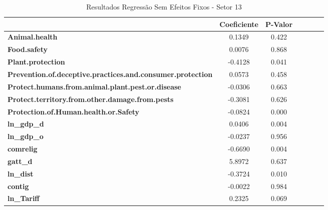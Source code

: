 \begin{table}[ht]
    \begin{center}
        \begin{tabular}{lcccccc}
                                                                   & \textbf{Coeficiente} & \textbf{P-Valor}\\
\midrule
\textbf{Animal.health}                                             &       0.1349  &         0.422       \\
\textbf{Food.safety}                                               &       0.0076  &         0.868       \\
\textbf{Plant.protection}                                          &      -0.4128  &         0.041       \\
\textbf{Prevention.of.deceptive.practices.and.consumer.protection} &       0.0573  &         0.458       \\
\textbf{Protect.humans.from.animal.plant.pest.or.disease}          &      -0.0306  &         0.663       \\
\textbf{Protect.territory.from.other.damage.from.pests}            &      -0.3081  &         0.626       \\
\textbf{Protection.of.Human.health.or.Safety}                      &      -0.0824  &         0.000       \\
\textbf{ln\_gdp\_d}                                                &       0.0406  &         0.004       \\
\textbf{ln\_gdp\_o}                                                &      -0.0237  &         0.956       \\
\textbf{comrelig}                                                  &      -0.6690  &         0.004       \\
\textbf{gatt\_d}                                                   &       5.8972  &         0.637       \\
\textbf{ln\_dist}                                                  &      -0.3724  &         0.010       \\
\textbf{contig}                                                    &      -0.0022  &         0.984       \\
\textbf{ln\_Tariff}                                                &       0.2325  &         0.069       \\
\bottomrule
\end{tabular}
\caption{Resultados Regressão Sem Efeitos Fixos - Setor 13}
\end{center}
\end{table}